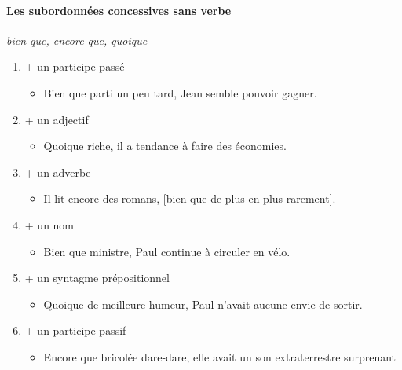 \documentclass[UTF8]{report}
\begin{document}
\paragraph{Les subordonnées concessives sans verbe}
\textit{bien que, encore que, quoique}
\begin{enumerate}
    \item + un participe passé
    \begin{itemize}
        \item Bien que parti un peu tard, Jean semble pouvoir gagner.
    \end{itemize}
    \item + un adjectif
    \begin{itemize}
        \item Quoique riche, il a tendance à faire des économies.
    \end{itemize}
    \item + un adverbe
    \begin{itemize}
        \item Il lit encore des romans, [bien que de plus en plus rarement].
    \end{itemize}
    \item + un nom
    \begin{itemize}
        \item Bien que ministre, Paul continue à circuler en vélo.
    \end{itemize}
    \item + un syntagme prépositionnel
    \begin{itemize}
        \item Quoique de meilleure humeur, Paul n’avait aucune envie de sortir.
    \end{itemize}
    \item + un participe passif
    \begin{itemize}
        \item Encore que bricolée dare-dare, elle avait un son extraterrestre surprenant
    \end{itemize}
\end{enumerate}
\end{document}
